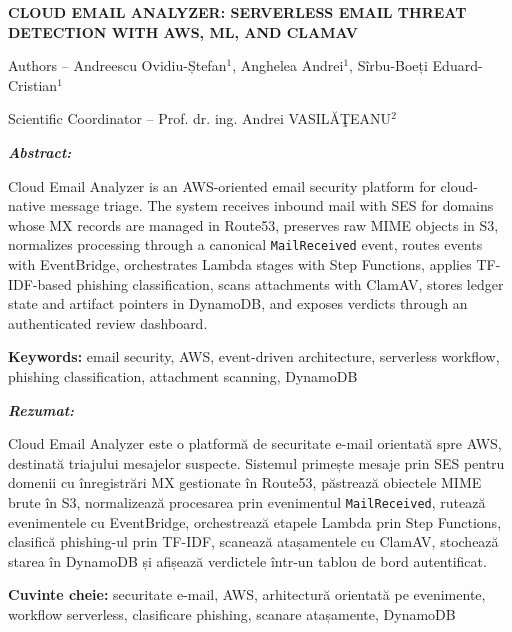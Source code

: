 \documentclass[12pt,a4paper]{article}
\newenvironment{templateabstract}[1]{%
  \begin{center}
  \begin{minipage}{0.86\textwidth}
  \small\itshape\noindent\textbf{#1:}\ %
}{%
  \end{minipage}
  \end{center}
}
\newcommand{\keywordline}[2]{%
  \begin{center}
  \begin{minipage}{0.86\textwidth}
  \small\noindent\textbf{#1:} #2
  \end{minipage}
  \end{center}
}
\begin{document}
\thispagestyle{firstpage}

\begin{center}
{\bfseries\large\MakeUppercase{Cloud Email Analyzer: Serverless Email Threat Detection with AWS, ML, and ClamAV}}\par
\vspace{1.0em}
{\normalsize Authors -- Andreescu Ovidiu-Ștefan$^{1}$, Anghelea Andrei$^{1}$, Sîrbu-Boeți Eduard-Cristian$^{1}$}\par
\vspace{0.3em}
{\normalsize Scientific Coordinator -- Prof. dr. ing. Andrei VASILĂŢEANU$^{2}$}\par
\end{center}

\vspace{1.0em}

\begin{templateabstract}{Abstract}
Cloud Email Analyzer is an AWS-oriented email security platform for cloud-native message triage. The system receives inbound mail with SES for domains whose MX records are managed in Route53, preserves raw MIME objects in S3, normalizes processing through a canonical \texttt{MailReceived} event, routes events with EventBridge, orchestrates Lambda stages with Step Functions, applies TF-IDF-based phishing classification, scans attachments with ClamAV, stores ledger state and artifact pointers in DynamoDB, and exposes verdicts through an authenticated review dashboard.
\end{templateabstract}

\keywordline{Keywords}{email security, AWS, event-driven architecture, serverless workflow, phishing classification, attachment scanning, DynamoDB}

\begin{templateabstract}{Rezumat}
Cloud Email Analyzer este o platformă de securitate e-mail orientată spre AWS, destinată triajului mesajelor suspecte. Sistemul primește mesaje prin SES pentru domenii cu înregistrări MX gestionate în Route53, păstrează obiectele MIME brute în S3, normalizează procesarea prin evenimentul \texttt{MailReceived}, rutează evenimentele cu EventBridge, orchestrează etapele Lambda prin Step Functions, clasifică phishing-ul prin TF-IDF, scanează atașamentele cu ClamAV, stochează starea în DynamoDB și afișează verdictele într-un tablou de bord autentificat.
\end{templateabstract}

\keywordline{Cuvinte cheie}{securitate e-mail, AWS, arhitectură orientată pe evenimente, workflow serverless, clasificare phishing, scanare atașamente, DynamoDB}
\end{document}
